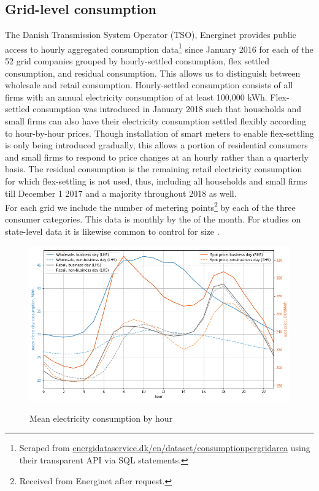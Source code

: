 \subsection{Grid-level consumption}
\label{subsec:d_consumption}
The Danish Transmission System Operator (TSO), Energinet provides public access to hourly aggregated consumption data\footnote{Scraped from \href{https://www.energidataservice.dk/en/dataset/consumptionpergridarea/}{energidataservice.dk/en/dataset/consumptionpergridarea} using their transparent API via SQL statements.} since January 2016 for each of the 52 grid companies grouped by hourly-settled consumption, flex settled consumption, and residual consumption. This allows us to distinguish between wholesale and retail consumption. Hourly-settled consumption consists of all firms with an annual electricity consumption of at least 100,000 kWh. Flex-settled consumption was introduced in January 2018 such that households and small firms can also have their electricity consumption settled flexibly according to hour-by-hour prices. Though installation of smart meters to enable flex-settling is only being introduced gradually, this allows a portion of residential consumers and small firms to respond to price changes at an hourly rather than a quarterly basis. The residual consumption is the remaining retail electricity consumption for which flex-settling is not used, thus, including all households and small firms till December 1 2017 and a majority throughout 2018 as well.
\medskip\\
For each grid we include the number of metering points\footnote{Received from Energinet after request.} by each of the three consumer categories. This data is monthly by the  of the month. For studies on state-level data it is likewise common to control for size \citep{burke2017price}.
\begin{figure}[H]
  \centering
  \caption{Mean electricity consumption by hour}
    \includegraphics[width=1. \textwidth]{03_figures/hours}
  \label{fig:cons_hour}
\end{figure}


